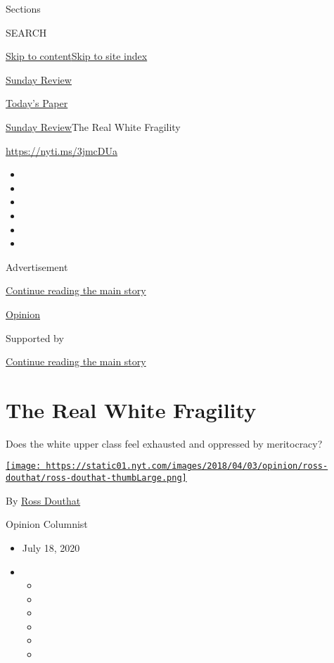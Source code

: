 Sections

SEARCH

\protect\hyperlink{site-content}{Skip to
content}\protect\hyperlink{site-index}{Skip to site index}

\href{https://www.nytimes.com/section/opinion/sunday}{Sunday Review}

\href{https://myaccount.nytimes.com/auth/login?response_type=cookie\&client_id=vi}{}

\href{https://www.nytimes.com/section/todayspaper}{Today's Paper}

\href{/section/opinion/sunday}{Sunday Review}\textbar{}The Real White
Fragility

\href{https://nyti.ms/3jmcDUa}{https://nyti.ms/3jmcDUa}

\begin{itemize}
\item
\item
\item
\item
\item
\item
\end{itemize}

Advertisement

\protect\hyperlink{after-top}{Continue reading the main story}

\href{/section/opinion}{Opinion}

Supported by

\protect\hyperlink{after-sponsor}{Continue reading the main story}

\hypertarget{the-real-white-fragility}{%
\section{The Real White Fragility}\label{the-real-white-fragility}}

Does the white upper class feel exhausted and oppressed by meritocracy?

\href{https://www.nytimes.com/by/ross-douthat}{\texttt{[image: https://static01.nyt.com/images/2018/04/03/opinion/ross-douthat/ross-douthat-thumbLarge.png]}}

By \href{https://www.nytimes.com/by/ross-douthat}{Ross Douthat}

Opinion Columnist

\begin{itemize}
\item
  July 18, 2020
\item
  \begin{itemize}
  \item
  \item
  \item
  \item
  \item
  \item
  \end{itemize}
\end{itemize}

